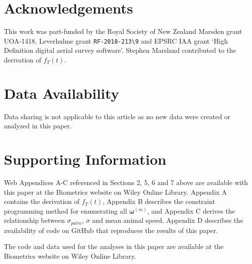 \documentclass[useAMS, usenatbib, referee]{biom}\usepackage[]{graphicx}\usepackage[]{color}
\begin{document}
\section*{Acknowledgements}
This work was part-funded by the Royal Society of New Zealand  Marsden grant UOA-1418,  Leverhulme grant \verb|RF-2018-213\9| and EPSRC IAA grant `High Definition digital aerial survey software'. Stephen Marsland contributed to the derivation of $f_T(t)$.

\section*{Data Availability}
Data sharing is not applicable to this article as no new data were created or analyzed in this paper.




\section*{Supporting Information}
Web Appendices A-C referenced in Sections 2, 5, 6 and 7 above are available with this paper at the Biometrics website on Wiley Online Library. Appendix A contains the derivation of $f_{T}(t)$, Appendix B describes the constraint programming method for enumerating all $\bm{\omega}^{(m)}$, and Appendix C derives the relationship between $\sigma_{palm}$, $\sigma$ and mean animal speed. Appendix D describes the availability of code on GitHub that reproduces the results of this paper. 

The code and data used for the analyses in this paper are available at the Biometrics website on Wiley Online Library.
\end{document}
